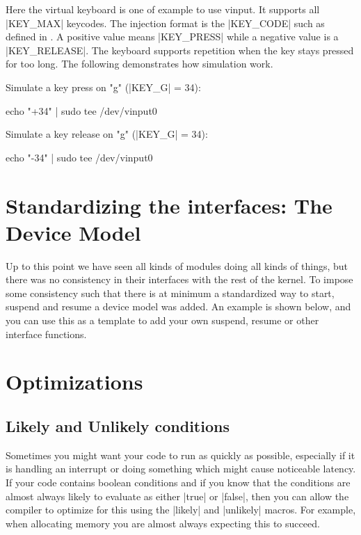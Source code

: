 \documentclass[10pt, oneside]{book}
\begin{document}

Here the virtual keyboard is one of example to use vinput.
It supports all \cpp|KEY_MAX| keycodes.
The injection format is the \cpp|KEY_CODE| such as defined in .
A positive value means \cpp|KEY_PRESS| while a negative value is a \cpp|KEY_RELEASE|.
The keyboard supports repetition when the key stays pressed for too long.
The following demonstrates how simulation work.

Simulate a key press on "g" (\cpp|KEY_G| = 34):

\begin{codebash}
echo "+34" | sudo tee /dev/vinput0
\end{codebash}

Simulate a key release on "g" (\cpp|KEY_G| = 34):

\begin{codebash}
echo "-34" | sudo tee /dev/vinput0
\end{codebash}



\section{Standardizing the interfaces: The Device Model}
\label{sec:device_model}
Up to this point we have seen all kinds of modules doing all kinds of things, but there was no consistency in their interfaces with the rest of the kernel.
To impose some consistency such that there is at minimum a standardized way to start, suspend and resume a device model was added.
An example is shown below, and you can use this as a template to add your own suspend, resume or other interface functions.


\section{Optimizations}
\label{sec:optimization}
\subsection{Likely and Unlikely conditions}
\label{sec:likely_unlikely}
Sometimes you might want your code to run as quickly as possible, especially if it is handling an interrupt or doing something which might cause noticeable latency.
If your code contains boolean conditions and if you know that the conditions are almost always likely to evaluate as either \cpp|true| or \cpp|false|,
then you can allow the compiler to optimize for this using the \cpp|likely| and \cpp|unlikely| macros.
For example, when allocating memory you are almost always expecting this to succeed.
\end{document}
